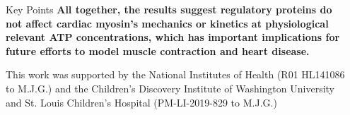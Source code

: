 \documentclass[final]{beamer}
\newlength{\sepwidth}
\newlength{\colwidth}
\newcommand{\separatorcolumn}{\begin{column}{\sepwidth}\end{column}}
\begin{document}
\begin{frame}[t]
\begin{columns}[t]
\begin{column}{\colwidth}
\begin{block}{Key Points}
    \textbf{All together, the results suggest regulatory proteins do not affect cardiac myosin's mechanics or kinetics at physiological relevant ATP concentrations, which has important implications for future efforts to model muscle contraction and heart disease.}

    \vspace{5mm}

    \tiny{This work was supported by the National Institutes of Health (R01 HL141086 to M.J.G.) and the Children’s Discovery Institute of Washington University and St. Louis Children’s Hospital (PM-LI-2019-829 to M.J.G.)}
  \end{block}
\end{column}

\separatorcolumn
\end{columns}
\end{frame}
\end{document}
